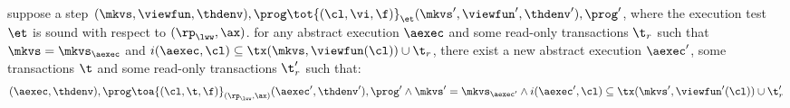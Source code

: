 \begin{lemma}
    \label{lem:aux-et-soundness-single-step-sound}
    suppose a step \( (\mkvs, \viewfun, \thdenv), \prog \tot{(\cl, \vi, \f)}_{\et} (\mkvs', \viewfun', \thdenv'), \prog' \), where the execution test \( \et \) is sound with respect to \( (\rp_{\lww}, \ax) \).
    for any abstract execution \( \aexec \) and some read-only transactions \( \t_{r} \) such that \( \mkvs = \mkvs_\aexec \) and \( i(\aexec, \cl) \subseteq \tx(\mkvs, \viewfun(\cl)) \cup \t_{r}\),
    there exist a new abstract execution \( \aexec' \), some transactions \( \t \) and some read-only transactions \( \t'_{r} \) such that: 
    \[
        (\aexec, \thdenv), \prog \toa{(\cl, \t, \f)}_{(\rp_{\lww}, \ax)} (\aexec', \thdenv'), \prog' \land \mkvs' = \mkvs_{\aexec'} 
        \land i(\aexec', \cl) \subseteq \tx(\mkvs', \viewfun'(\cl)) \cup \t'_{r}
    \]
\end{lemma}
